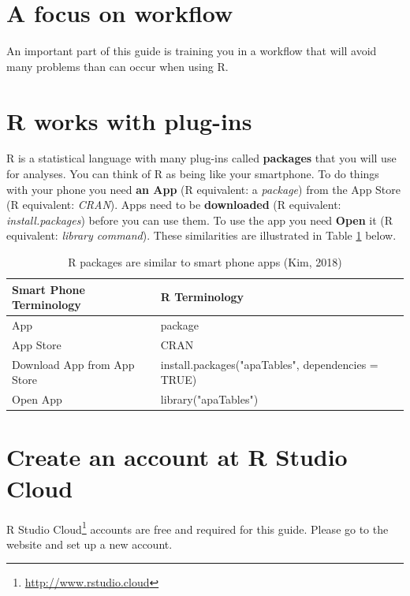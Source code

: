 \documentclass[
]{krantz}
\renewcommand{\href}[2]{#2\footnote{\url{#1}}}
\begin{document}
\hypertarget{a-focus-on-workflow}{%
\section{A focus on workflow}\label{a-focus-on-workflow}}

An important part of this guide is training you in a workflow that will avoid many problems than can occur when using R.

\hypertarget{r-works-with-plug-ins}{%
\section{R works with plug-ins}\label{r-works-with-plug-ins}}

R is a statistical language with many plug-ins called \textbf{packages} that you will use for analyses. You can think of R as being like your smartphone. To do things with your phone you need \textbf{an App} (R equivalent: a \emph{package}) from the App Store (R equivalent: \emph{CRAN}). Apps need to be \textbf{downloaded} (R equivalent: \emph{install.packages}) before you can use them. To use the app you need \textbf{Open} it (R equivalent: \emph{library command}). These similarities are illustrated in Table \ref{tab:appstore} below.

\begin{table}

\caption{\label{tab:appstore}R packages are similar to smart phone apps (Kim, 2018)}
\centering
\begin{tabular}[t]{ll}
\toprule
Smart Phone Terminology & R Terminology\\
\midrule
App & package\\
App Store & CRAN\\
Download App from App Store & install.packages("apaTables", dependencies = TRUE)\\
Open App & library("apaTables")\\
\bottomrule
\end{tabular}
\end{table}

\hypertarget{create-an-account-at-r-studio-cloud}{%
\section{Create an account at R Studio Cloud}\label{create-an-account-at-r-studio-cloud}}

\href{http://www.rstudio.cloud}{R Studio Cloud} accounts are free and required for this guide. Please go to the website and set up a new account.
\end{document}
